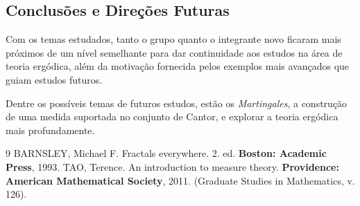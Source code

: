 \documentclass[12pt, a4paper]{article}
\theoremstyle{definition}
\begin{document}
\subsection*{Conclusões e Direções Futuras}
Com os temas estudados, tanto o grupo quanto o integrante novo ficaram mais próximos de um nível semelhante para dar continuidade aos estudos na área de teoria ergódica, além da motivação fornecida pelos exemplos mais avançados que guiam estudos futuros.

Dentre os possíveis temas de futuros estudos, estão os \textit{Martingales}, a construção de uma medida suportada no conjunto de Cantor, e explorar a teoria ergódica mais profundamente.

\begin{thebibliography}{9}
	BARNSLEY, Michael F. Fractals everywhere. 2. ed. \textbf{Boston: Academic Press}, 1993.
	TAO, Terence. An introduction to measure theory. \textbf{Providence: American Mathematical Society}, 2011. (Graduate Studies in Mathematics, v. 126).
\end{thebibliography}
\end{document}
